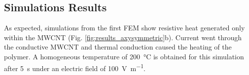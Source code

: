\begin{table}[h]
	\center
	\caption{Material properties, unless noted, the properties for PEI are taken from SABIC's technical documentation}
	\label{tab:material_properties}
\end{table}

\FloatBarrier
\subsection{Simulations Results}

As expected, simulations from the first FEM show resistive heat generated only within the MWCNT (Fig. \ref{fig:results_axysymmetric}b). 
Current went through the conductive MWCNT and thermal conduction caused the heating of the polymer. 
A homogeneous temperature of \SI{200}{\celsius} is obtained for this simulation after \SI{5}{\second} under an electric field of \SI{100}{\volt\per\metre}. 

